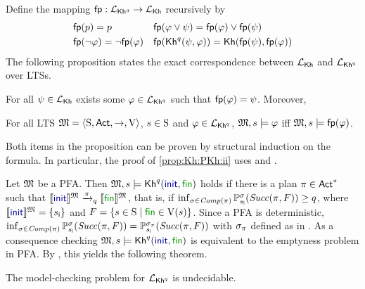 Define the mapping $\fgetprob:\PKh\to\Khlogic$ recursively by
%
\begin{align*}
  & \fgetprob(p) = p
  && \fgetprob(\varphi \vee \psi) = \fgetprob(\varphi) \vee \fgetprob(\psi)\\
  & \fgetprob(\neg \varphi) = \neg \fgetprob(\varphi)
  && \fgetprob(\kh^q(\psi,\varphi)) = \kh(\fgetprob(\psi),\fgetprob(\varphi))
\end{align*}
%
The following proposition states the exact correspondence between
$\Khlogic$ and $\PKh$ over LTSs.
%
\begin{proposition}\label{prop:Kh:PKh}
  \begin{enumerate*}[(1)]
  \item\label{prop:Kh:PKh:i}%
    For all $\psi\in\Khlogic$ exists some
    $\varphi\in\PKh$ such that $\fgetprob(\varphi)=\psi$.
    Moreover,
  \item\label{prop:Kh:PKh:ii}%
    For all LTS $\model = \tup{\S,\Act,\ra,\V}$, $s\in\S$ and
    $\varphi\in\PKh$,
    $\model,s\models\varphi$ iff $\model,s\models\fgetprob(\varphi)$.
  \end{enumerate*}
\end{proposition}

Both items in the proposition can be proven by structural induction on
the formula. In particular, the proof of \cref{prop:Kh:PKh:ii} uses
 and .


Let $\model$ be a PFA. Then $\model,s\models\kh^q(\init,\fin)$ holds
if there is a plan $\plan\in \Act^*$ such that
$\truthset{\model}{\init}\reach{\plan}_q\truthset{\model}{\fin}$, that
is, if
$\inf_{\strat\in\Comp(\plan)}\Prob^\strat_{s_{\textsf{i}}}(\Succ(\plan,F)) \geq q$,
where $\truthset{\model}{\init}=\{s_{\textsf{i}}\}$ and
$F=\{{s\in\S}\mid{\fin\in\V(s)}\}$.
%
Since a PFA is deterministic,
$\inf_{\strat\in\Comp(\plan)}\Prob^\strat_{s_{\textsf{i}}}(\Succ(\plan,F)) =
\Prob^{\strat_\plan}_{s_{\textsf{i}}}(\Succ(\plan,F))$
with $\strat_\plan$ defined as in .
%
As a consequence checking $\model,s\models\kh^q(\init,\fin)$ is
equivalent to the emptyness problem in PFA.  By
, this yields the following theorem.

\begin{theorem}\label{th:mc:PKh:undecidable}
  The model-checking problem for $\PKh$ is undecidable.
\end{theorem}

